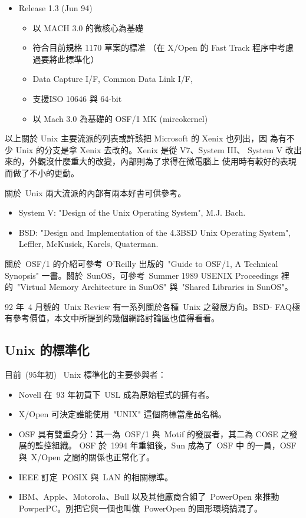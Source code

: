\documentclass{article}
\begin{document}
\begin{CJK*}{Bg5}{ming}
\begin{itemize}
         \item Release 1.3 (Jun 94)
	 \begin{itemize}
           \item 以 MACH 3.0 的微核心為基礎
           \item 符合目前規格 1170 草案的標准
            （在 X/Open 的 Fast Track 程序中考慮過要將此標準化）
           \item Data Capture I/F, Common Data Link I/F,
           \item 支援ISO 10646 與 64-bit
           \item 以 Mach 3.0 為基礎的 OSF/1 MK (mircokernel)
	 \end{itemize}
\end{itemize}

    以上關於 Unix 主要流派的列表或許該把 Microsoft 的 Xenix 也列出，因
    為有不少 Unix 的分支是拿 Xenix 去改的。Xenix 是從 V7、System III、
    System V 改出來的，外觀沒什麼重大的改變，內部則為了求得在微電腦上
    使用時有較好的表現而做了不小的更動。

    關於~Unix 兩大流派的內部有兩本好書可供參考。
\begin{itemize}
      \item System V: "Design of the Unix Operating System", M.J. Bach.
      \item BSD: "Design and Implementation of the 4.3BSD Unix Operating System",
        Leffler, McKusick, Karels, Quaterman.
\end{itemize}
    關於~OSF/1 的介紹可參考~O'Reilly 出版的~"Guide to OSF/1, A Technical 
    Synopsis" 一書。關於~SunOS，可參考~Summer 1989 USENIX Proceedings
    裡的~"Virtual Memory Architecture in SunOS" 與~"Shared Libraries in 
    SunOS"。

    92 年~4 月號的~Unix Review 有一系列關於各種~Unix 之發展方向。BSD-
    FAQ極有參考價值，本文中所提到的幾個網路討論區也值得看看。

\subsection{Unix 的標準化}

     目前~(95年初) ~Unix 標準化的主要參與者：
\begin{itemize}
      \item Novell 在~93 年初買下~USL 成為原始程式的擁有者。
      \item X/Open 可決定誰能使用~"UNIX" 這個商標當產品名稱。
      \item OSF 具有雙重身分：其一為~OSF/1 與~Motif 的發展者，其二為 COSE 
        之發展的監控組織。 OSF 於~1994 年重組後，Sun 成為了~OSF 中
        的一員，OSF 與~X/Open 之間的關係也正常化了。
      \item IEEE 訂定~POSIX 與~LAN 的相關標準。
      \item IBM、Apple、Motorola、Bull 以及其他廠商合組了~PowerOpen 來推動
        PowperPC。別把它與一個也叫做~PowerOpen 的圖形環境搞混了。
\end{itemize}


\end{CJK*}
\end{document}
